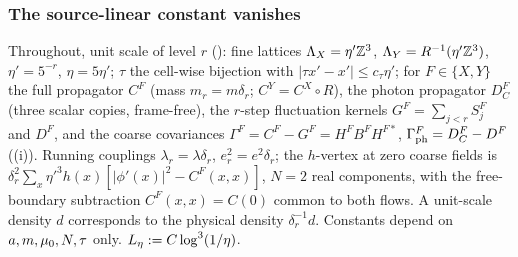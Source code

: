
\subsubsection*{The source-linear constant vanishes}

Throughout, unit scale of level $r$ (): fine lattices $\Lambda_X=\eta'\mathbb Z^3$, $\Lambda_Y=R^{-1}(\eta'\mathbb Z^3)$, $\eta'=5^{-r}$, $\eta=5\eta'$; $\tau$ the cell-wise bijection with $|\tau x'-x'|\le c_\tau\eta'$; for $F\in\{X,Y\}$ the full propagator $C^F$ (mass $m_r=m\delta_r$; $C^Y=C^X\circ R$), the photon propagator $D^F_C$ (three scalar copies, frame-free), the $r$-step fluctuation kernels $G^F=\sum_{j<r}S^F_j$ and $D^F$, and the coarse covariances $\Gamma^F=C^F-G^F=H^FB^FH^{F*}$, $\Gamma^F_{\rm ph}=D^F_C-D^F$ ((i)). Running couplings $\lambda_r=\lambda\delta_r$, $e_r^2=e^2\delta_r$; the $h$-vertex at zero coarse fields is $\delta_r^2\sum_x\eta'^3h(x)[|\phi'(x)|^2-C^F(x,x)]$, $N=2$ real components, with the free-boundary subtraction $C^F(x,x)=C(0)$ common to both flows. A unit-scale density $d$ corresponds to the physical density $\delta_r^{-1}d$. Constants depend on $a,m,\mu_0,N,\tau$ only. $L_\eta:= C\log^3(1/\eta)$.

